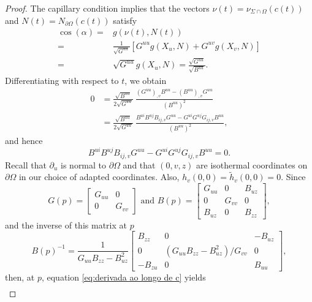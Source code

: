 \documentclass[10pt,a4paper]{amsart}
\begin{document}
\begin{proof}
The capillary condition implies that the vectors $\nu(t)=\nu_{\Sigma\cap\Omega}(c(t))$ and $N(t)=N_{\partial \Omega}(c(t))$ satisfy
\begin{align*}
    \cos(\alpha) = & g(\nu(t),N(t)) \\
    = & \frac{1}{\sqrt{G^{uu}}}[G^{uu}g(X_u,N)+G^{uv}g(X_v,N)] \\
    = & \sqrt{G^{uu}}g(X_u,N)= \frac{\sqrt{G^{uu}}}{\sqrt{B^{uu}}}.
\end{align*}
Differentiating with respect to $t$, we obtain
\begin{align*}
    0 & = \frac{\sqrt{B^{uu}}}{2\sqrt{G^{uu}}}
    \ \frac{(G^{uu})_{,v}B^{uu}-(B^{uu})_{,v}G^{uu}}{(B^{uu})^2} \\
    & = \frac{\sqrt{B^{uu}}}{2\sqrt{G^{uu}}}\ \frac{B^{ui}B^{uj}B_{ij,v}G^{uu}-G^{ui}G^{uj}G_{ij,v}B^{uu}}{(B^{uu})^2},
\end{align*}
and hence
\begin{equation}\label{eq:derivada ao longo de c}
B^{ui}B^{uj}B_{ij,v}G^{uu}-G^{ui}G^{uj}G_{ij,v}B^{uu} = 0.
\end{equation}
Recall that $\partial_u$ is normal to $\partial\Omega$ and that $(0,v,z)$ are isothermal coordinates on $\partial\Omega$ in our choice of adapted coordinates. Also, $h_v(0,0)=\widetilde{h}_v(0,0)=0$. Since
\begin{equation*}    
    G(p)=\begin{bmatrix}
            G_{uu} & 0 \\
            0 & G_{vv}
        \end{bmatrix} \text{ and }
    B(p)=\begin{bmatrix}
            G_{uu} & 0 & B_{uz} \\
            0 & G_{vv} & 0 \\
            B_{uz} & 0 & B_{zz}
        \end{bmatrix},
\end{equation*}
and the inverse of this matrix at $p$ 
\begin{equation*}
    B(p)^{-1}=\frac{1}{G_{uu}B_{zz}-B_{uz}^2}\begin{bmatrix}
            B_{zz} & 0 & -B_{uz} \\
            0 & (G_{uu}B_{zz}-B_{uz}^2)/G_{vv} & 0 \\
            -B_{zu} & 0 & B_{uu}
        \end{bmatrix},
\end{equation*}
then, at $p$, equation \eqref{eq:derivada ao longo de c} yields
\begin{align*}

\end{align*}
\end{proof}
\end{document}
